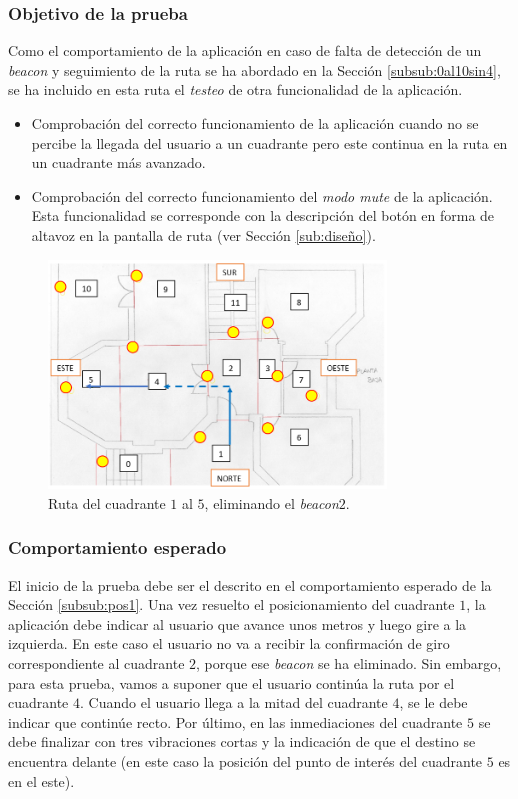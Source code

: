\subsubsection*{Objetivo de la prueba}

Como el comportamiento de la aplicación en caso de falta de detección de un \textit{beacon} y seguimiento de la ruta se ha abordado en la Sección \ref{subsub:0al10sin4}, se ha incluido en esta ruta el \textit{testeo} de otra funcionalidad de la aplicación. 

\begin{itemize}
	\item Comprobación del correcto funcionamiento de la aplicación cuando no se percibe la llegada del usuario a un cuadrante pero este continua en la ruta en un cuadrante más avanzado.
	
	\item Comprobación del correcto funcionamiento del \textit{modo mute} de la aplicación. Esta funcionalidad se corresponde con la descripción del botón en forma de altavoz en la pantalla de ruta (ver Sección \ref{sub:diseño}). 
\end{itemize}

\begin{figure}[t]
	\centering
	\includegraphics[width=0.8\textwidth]{Imagenes/Evaluacion/del1al5sin2}
	\caption{Ruta del cuadrante $1$ al $5$, eliminando el \textit{beacon$2$}.}
	\label{fig:del1al5sin2}
\end{figure}

\subsubsection*{Comportamiento esperado}

El inicio de la prueba debe ser el descrito en el comportamiento esperado de la Sección \ref{subsub:pos1}. Una vez resuelto el posicionamiento del cuadrante $1$, la aplicación debe indicar al usuario que avance unos metros y luego gire a la izquierda. En este caso el usuario no va a recibir la confirmación de giro correspondiente al cuadrante $2$, porque ese \textit{beacon} se ha eliminado. Sin embargo, para esta prueba, vamos a suponer que el usuario continúa la ruta por el cuadrante $4$. Cuando el usuario llega a la mitad del cuadrante $4$, se le debe indicar que continúe recto. Por último, en las inmediaciones del cuadrante $5$ se debe finalizar con tres vibraciones cortas y la indicación de que el destino se encuentra delante (en este caso la posición del punto de interés del cuadrante $5$ es en el este).

